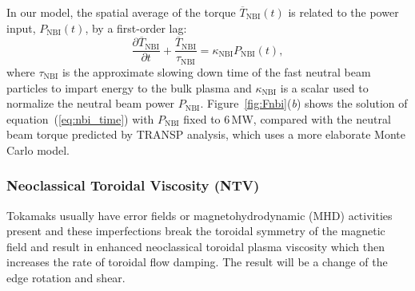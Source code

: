 \documentclass{iopart}
\begin{document}
In our model, the spatial average of the torque $\overline{T}_\text{NBI}(t)$ is
related to the power input, $P_\text{NBI}(t)$, by a first-order lag:
%
\begin{equation}
   \frac{\partial \overline{T}_\text{NBI}}{\partial t}
   + \frac{\overline{T}_\text{NBI}}{\tau_\text{NBI}}  = \kappa_\text{NBI} P_\text{NBI}(t),
   \label{eq:nbi_time}
\end{equation}
%
where $\tau_\text{NBI}$ is the approximate slowing down time of the fast neutral
beam particles to impart energy to the bulk plasma and $\kappa_\text{NBI}$ is a
scalar used to normalize the neutral beam power $P_\text{NBI}$.
%
Figure~\ref{fig:Fnbi}(\emph{b}) shows the solution of
equation~(\ref{eq:nbi_time}) with $P_\text{NBI}$ fixed to 6\,MW, compared with
the neutral beam torque predicted by TRANSP analysis, which uses a more
elaborate Monte Carlo model.



\subsubsection{Neoclassical Toroidal Viscosity (NTV)}
 \label{TNTV}

Tokamaks usually have error fields or magnetohydrodynamic (MHD) activities present and these imperfections break the toroidal symmetry of the magnetic field and result in enhanced neoclassical toroidal plasma viscosity which then increases the rate of toroidal flow damping. The result will be a change of the edge rotation and shear. 
\end{document}
